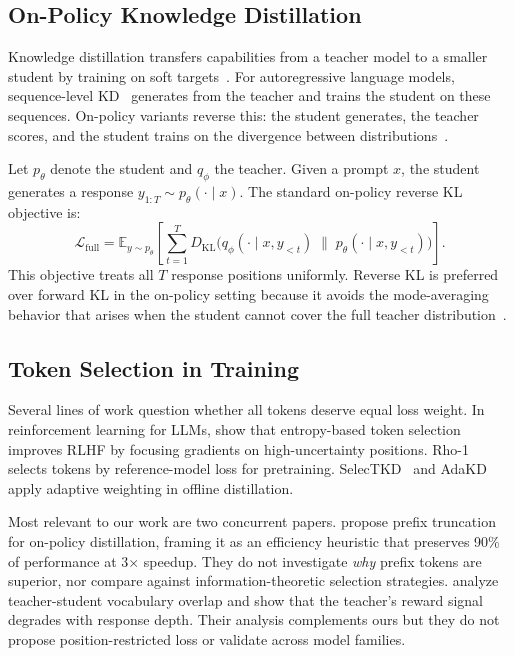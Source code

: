 \subsection{On-Policy Knowledge Distillation}

Knowledge distillation transfers capabilities from a teacher model to a smaller student by training on soft targets~\citep{hinton2015distilling}.
For autoregressive language models, sequence-level KD~\citep{kim2016sequence} generates from the teacher and trains the student on these sequences.
On-policy variants reverse this: the student generates, the teacher scores, and the student trains on the divergence between distributions~\citep{agarwal2024gkd, gu2024minillm}.

Let $p_\theta$ denote the student and $q_\phi$ the teacher.
Given a prompt $x$, the student generates a response $y_{1:T} \sim p_\theta(\cdot \mid x)$.
The standard on-policy reverse KL objective is:
\begin{equation}
\mathcal{L}_{\mathrm{full}} = \mathbb{E}_{y \sim p_\theta}\left[\sum_{t=1}^{T} D_{\mathrm{KL}}\!\big(q_\phi(\cdot \mid x, y_{<t}) \;\|\; p_\theta(\cdot \mid x, y_{<t})\big)\right].
\label{eq:full_kl}
\end{equation}
This objective treats all $T$ response positions uniformly.
Reverse KL is preferred over forward KL in the on-policy setting because it avoids the mode-averaging behavior that arises when the student cannot cover the full teacher distribution~\citep{gu2024minillm}.

\subsection{Token Selection in Training}

Several lines of work question whether all tokens deserve equal loss weight.
In reinforcement learning for LLMs, \citet{wang2025beyond} show that entropy-based token selection improves RLHF by focusing gradients on high-uncertainty positions.
Rho-1~\citep{lin2024rho1} selects tokens by reference-model loss for pretraining.
SelecTKD~\citep{chen2025selectkd} and AdaKD~\citep{wu2025adakd} apply adaptive weighting in offline distillation.

Most relevant to our work are two concurrent papers.
\citet{zhang2025fast} propose prefix truncation for on-policy distillation, framing it as an efficiency heuristic that preserves 90\% of performance at 3$\times$ speedup.
They do not investigate \emph{why} prefix tokens are superior, nor compare against information-theoretic selection strategies.
\citet{li2025rethinking} analyze teacher-student vocabulary overlap and show that the teacher's reward signal degrades with response depth.
Their analysis complements ours but they do not propose position-restricted loss or validate across model families.

